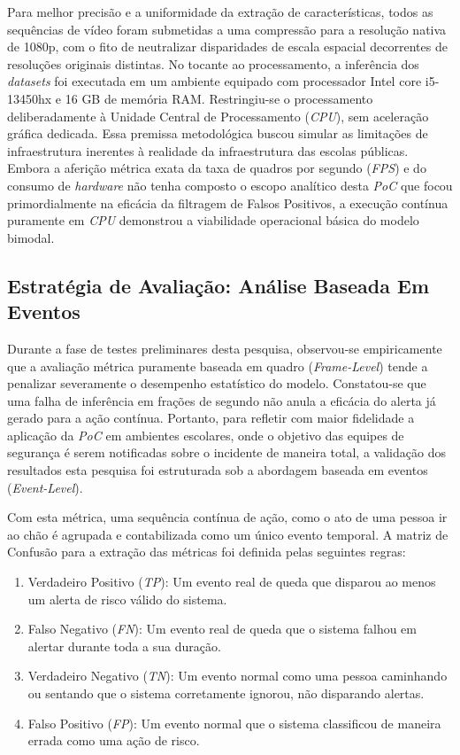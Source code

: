 \documentclass[12pt]{article}
\begin{document}
Para melhor precisão e a uniformidade da extração de características, todos as sequências de vídeo foram
submetidas a uma compressão para a resolução nativa de 1080p, com o fito de neutralizar disparidades de 
escala espacial decorrentes de resoluções originais distintas. No tocante ao processamento, a inferência dos
\textit{datasets} foi executada em um ambiente equipado com processador Intel core i5-13450hx e 16 GB de 
memória RAM. Restringiu-se o processamento deliberadamente à Unidade Central de Processamento (\textit{CPU}),
sem aceleração gráfica dedicada. Essa premissa metodológica buscou simular as limitações de infraestrutura
inerentes à realidade da infraestrutura das escolas públicas. Embora a aferição métrica exata da taxa de
quadros por segundo (\textit{FPS}) e do consumo de \textit{hardware} não tenha composto o escopo analítico
desta \textit{PoC} que focou primordialmente na eficácia da filtragem de Falsos Positivos, a execução 
contínua puramente em \textit{CPU} demonstrou a viabilidade operacional básica do modelo bimodal.

\subsection{Estratégia de Avaliação: Análise Baseada Em Eventos}

Durante a fase de testes preliminares desta pesquisa, observou-se empiricamente que a avaliação métrica
puramente baseada em quadro (\textit{Frame-Level}) tende a penalizar severamente o desempenho estatístico
do modelo. Constatou-se que uma falha de inferência em frações de segundo não anula a eficácia do alerta já
gerado para a ação contínua. Portanto, para refletir com maior fidelidade a aplicação da \textit{PoC} em
ambientes escolares, onde o objetivo das equipes de segurança é serem notificadas sobre o incidente de
maneira total, a validação dos resultados esta pesquisa foi estruturada sob a abordagem baseada em eventos
(\textit{Event-Level}).

Com esta métrica, uma sequência contínua de ação, como o ato de uma pessoa ir ao chão é agrupada e
contabilizada como um único evento temporal. A matriz de Confusão para a extração das métricas foi
definida pelas seguintes regras:

\begin{enumerate}
    \item Verdadeiro Positivo (\textit{TP}): Um evento real de queda que disparou ao menos um alerta de 
    risco válido do sistema.
    \item Falso Negativo (\textit{FN}): Um evento real de queda que o sistema falhou em alertar durante
    toda a sua duração.
    \item Verdadeiro Negativo (\textit{TN}): Um evento normal como uma pessoa caminhando ou sentando que
    o sistema corretamente ignorou, não disparando alertas.
    \item Falso Positivo (\textit{FP}): Um evento normal que o sistema classificou de maneira errada como
    uma ação de risco.
\end{enumerate}
\end{document}
